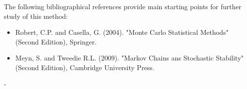 {  The following bibliographical references provide main starting points for further study of  this method:
  \begin{itemize}
  \item Robert, C.P. and Casella, G. (2004).
    "Monte Carlo Statistical Methods" (Second Edition), Springer.
  \item Meyn, S. and Tweedie R.L. (2009).
    "Markov Chains ans Stochastic Stability" (Second Edition), Cambridge University Press.
  \end{itemize}

}
{
-
}